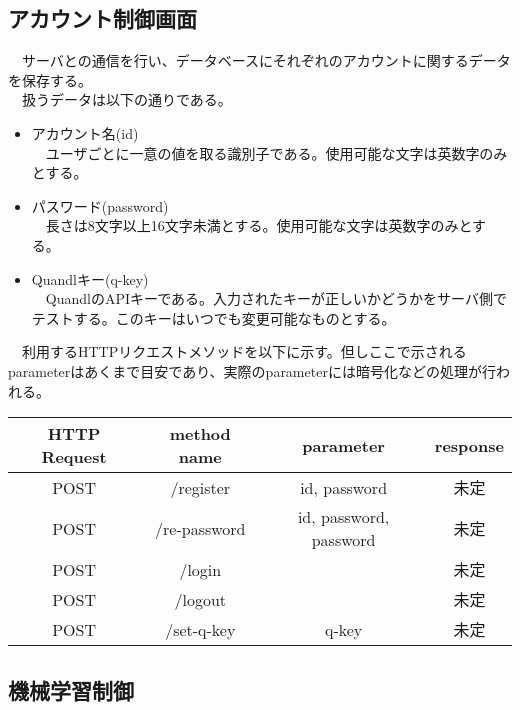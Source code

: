 \documentclass{scrartcl}
\begin{document}
\subsection{アカウント制御画面}
\label{sec:org6cdb861}
　サーバとの通信を行い、データベースにそれぞれのアカウントに関するデータを保存する。\\
　扱うデータは以下の通りである。\\
\begin{itemize}
\item アカウント名(id)\\
　ユーザごとに一意の値を取る識別子である。使用可能な文字は英数字のみとする。\\
\item パスワード(password)\\
　長さは8文字以上16文字未満とする。使用可能な文字は英数字のみとする。\\
\item Quandlキー(q-key)\\
　QuandlのAPIキーである。入力されたキーが正しいかどうかをサーバ側でテストする。このキーはいつでも変更可能なものとする。\\
\end{itemize}
　利用するHTTPリクエストメソッドを以下に示す。但しここで示されるparameterはあくまで目安であり、実際のparameterには暗号化などの処理が行われる。\\

\begin{center}
\begin{tabular}{|c|c|c|c|}
\hline
HTTP Request & method name & parameter & response\\
\hline
POST & /register & id, password & 未定\\
POST & /re-password & id, password, password & 未定\\
POST & /login &  & 未定\\
POST & /logout &  & 未定\\
POST & /set-q-key & q-key & 未定\\
\hline
\end{tabular}
\end{center}

\subsection{機械学習制御}
\label{sec:org59e7c98}
\end{document}
